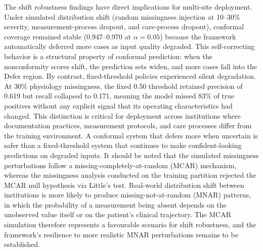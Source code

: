 The shift robustness findings have direct implications for multi-site deployment. Under simulated distribution shift (random missingness injection at 10--30\% severity, measurement-process dropout, and care-process dropout), conformal coverage remained stable (0.947--0.970 at $\alpha = 0.05$) because the framework automatically deferred more cases as input quality degraded. This self-correcting behavior is a structural property of conformal prediction: when the nonconformity scores shift, the prediction sets widen, and more cases fall into the Defer region. By contrast, fixed-threshold policies experienced silent degradation. At 30\% physiology missingness, the fixed 0.50 threshold retained precision of 0.619 but recall collapsed to 0.171, meaning the model missed 83\% of true positives without any explicit signal that its operating characteristics had changed. This distinction is critical for deployment across institutions where documentation practices, measurement protocols, and care processes differ from the training environment. A conformal system that defers more when uncertain is safer than a fixed-threshold system that continues to make confident-looking predictions on degraded inputs. It should be noted that the simulated missingness perturbations follow a missing-completely-at-random (MCAR) mechanism, whereas the missingness analysis conducted on the training partition rejected the MCAR null hypothesis via Little's test. Real-world distribution shift between institutions is more likely to produce missing-not-at-random (MNAR) patterns, in which the probability of a measurement being absent depends on the unobserved value itself or on the patient's clinical trajectory. The MCAR simulation therefore represents a favourable scenario for shift robustness, and the framework's resilience to more realistic MNAR perturbations remains to be established.

